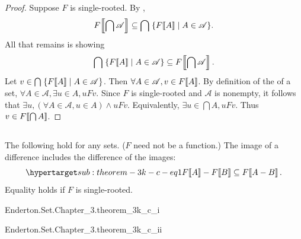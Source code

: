 \documentclass{report}
\begin{document}
\begin{proof}
      Suppose $F$ is single-rooted.
      By ,
        $$F\!\left\llbracket\bigcap\mathscr{A}\right\rrbracket \subseteq
          \bigcap\;\{F\!\left\llbracket A\right\rrbracket \mid A \in \mathscr{A}\}.$$
      All that remains is showing
        $$\bigcap\;\{F\!\left\llbracket A\right\rrbracket \mid A \in \mathscr{A}\} \subseteq
          F\!\left\llbracket\bigcap\mathscr{A}\right\rrbracket.$$
      Let $v \in \bigcap\;\{F\!\left\llbracket A\right\rrbracket \mid A \in \mathscr{A}\}$.
      Then $\forall A \in \mathscr{A}, v \in F\!\left\llbracket A\right\rrbracket$.
      By definition of the  of a set,
        $\forall A \in \mathscr{A}, \exists u \in A, uFv$.
      Since $F$ is single-rooted and $\mathscr{A}$ is nonempty, it follows that
        $\exists u, (\forall A \in \mathscr{A}, u \in A) \land uFv$.
      Equivalently, $\exists u \in \bigcap{A}, uFv$.
      Thus $v \in F\!\left\llbracket\bigcap{A}\right\rrbracket$.

  \end{proof}

\subsection{}%

  \begin{theorem}[3K(c)]
    The following hold for any sets. ($F$ need not be a function.)
    The image of a difference includes the difference of the images:
      \begin{equation}
        \hyperlabel{sub:theorem-3k-c-eq1}
        \img{F}{A} - \img{F}{B} \subseteq \img{F}{A - B}.
      \end{equation}
    Equality holds if $F$ is single-rooted.
  \end{theorem}

    {Enderton.Set.Chapter\_3.theorem\_3k\_c\_i}

    {Enderton.Set.Chapter\_3.theorem\_3k\_c\_ii}
\end{document}
